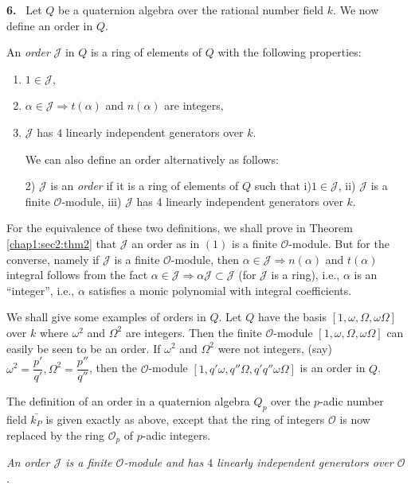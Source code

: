 \textbf{6.}~ Let $Q$ be a quaternion algebra over the rational number field
$k$. We now define an order in $Q$. 

\begin{defi*}%
  An { \em order} $\mathcal{J} $ in $Q$ is a ring of elements of $Q$
  with the following properties: 
  \begin{enumerate}[\rm i)]
  \item $1 \in \mathcal{J}$,
  \item $\alpha \in \mathcal{J} \Rightarrow t(\alpha)$ and $n(\alpha)$
    are integers, 
  \item $\mathcal{J}$ has $4$ linearly independent generators over $k$.
    
    We can also define an order alternatively as follows:
    
    2) $\mathcal{J}$ is an { \em order} if it is a ring of elements of
    $Q$ such that 
    i)\pageoriginale $1 \in \mathcal{J}$, ii) $\mathcal{J}$ is a finite
    $\mathscr{O}$-module, iii) $\mathcal{J}$ has 4 linearly
    independent generators over $k$. 
  \end{enumerate}

  For the equivalence of these two definitions, we shall prove in
  Theorem \ref{chap1:sec2:thm2} that $\mathcal{J}$ an order as in $(1)$ is a finite
  $\mathscr{O}$-module. But for the converse, namely if $\mathcal{J}$
  is a finite $\mathscr{O}$-module, then $\alpha \in \mathcal{J}
  \Rightarrow n(\alpha)$ and $t(\alpha)$ integral follows from the
  fact $\alpha \in \mathcal{J} \Rightarrow \alpha \mathcal{J} \subset
  \mathcal{J} $ (for $\mathcal{J}$ is a ring), i.e., $\alpha$ is an
  ``integer'', i.e., $\alpha$ satisfies a monic polynomial with
  integral coefficients. 
\end{defi*}  
  
We shall give some examples of orders in $Q$. Let $Q$ have the basis
$[1, \omega, \Omega, \omega \Omega]$ over $k$ where $\omega^2$ and
$\Omega^2$ are integers. Then the finite $\mathscr{O}$-module $[1,
  \omega, \Omega, \omega \Omega]$ can easily be seen to be an
order. If $\omega^2$ and $\Omega^2$ were not integers, (say) $\omega^2
= \dfrac{p'}{q'}, \Omega^2 = \dfrac{p''}{q''}$, then the
$\mathscr{O}$-module  $[1, q' \omega, q'' \Omega, q' q''\omega
  \Omega]$ is an order in $Q$. 

The definition of an order in a quaternion algebra $Q_p$ over the
$p$-adic number field $\bar{k_P}$ is given exactly as above, except
that the ring of integers $\mathscr{O}$ is now replaced by the ring
$\mathscr{O}_p$ of $p$-adic integers. 
\begin{theorem}\label{chap1:sec2:thm2}%
  {\em An order $\mathcal{J}$ is a finite $\mathscr{O}$-module and has
    $4$ linearly independent generators over $\mathscr{O}$}. 
\end{theorem}

